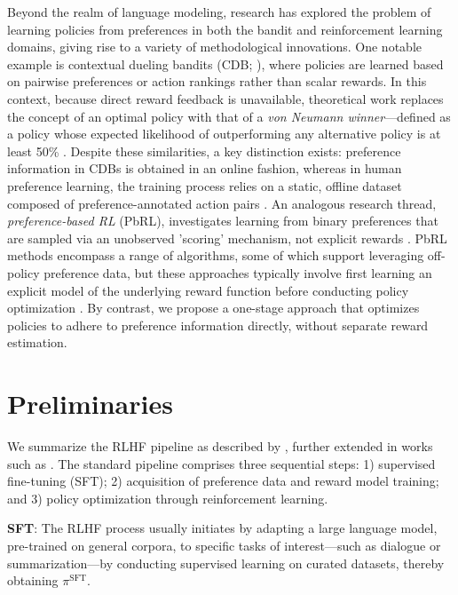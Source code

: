 Beyond the realm of language modeling, research has explored the problem of learning policies from preferences in both the bandit and reinforcement learning domains, giving rise to a variety of methodological innovations. One notable example is contextual dueling bandits (CDB; \cite{yue2012karmed,dudik2015contextual}), where policies are learned based on pairwise preferences or action rankings rather than scalar rewards. In this context, because direct reward feedback is unavailable, theoretical work replaces the concept of an optimal policy with that of a \textit{von Neumann winner}—defined as a policy whose expected likelihood of outperforming any alternative policy is at least 50\% \citep{dudik2015contextual}. Despite these similarities, a key distinction exists: preference information in CDBs is obtained in an online fashion, whereas in human preference learning, the training process relies on a static, offline dataset composed of preference-annotated action pairs \citep{yan2022human}. An analogous research thread, \textit{preference-based RL} (PbRL), investigates learning from binary preferences that are sampled via an unobserved 'scoring' mechanism, not explicit rewards \citep{BusaFekete2014,ruiz2023dueling}. PbRL methods encompass a range of algorithms, some of which support leveraging off-policy preference data, but these approaches typically involve first learning an explicit model of the underlying reward function before conducting policy optimization \citep{jain2013learning,BusaFekete2014,christiano2017deep,sadigh2017active,kupcsik2018learning}. By contrast, we propose a one-stage approach that optimizes policies to adhere to preference information directly, without separate reward estimation.

\section{Preliminaries}\label{section:prelims}

We summarize the RLHF pipeline as described by \citeauthor{ziegler2020finetuning}, further extended in works such as \citep{stiennon2022learning, bai2022training, ouyang2022training}. The standard pipeline comprises three sequential steps: 1) supervised fine-tuning (SFT); 2) acquisition of preference data and reward model training; and 3) policy optimization through reinforcement learning.

\textbf{SFT}: The RLHF process usually initiates by adapting a large language model, pre-trained on general corpora, to specific tasks of interest—such as dialogue or summarization—by conducting supervised learning on curated datasets, thereby obtaining $\pi^\text{SFT}$.

